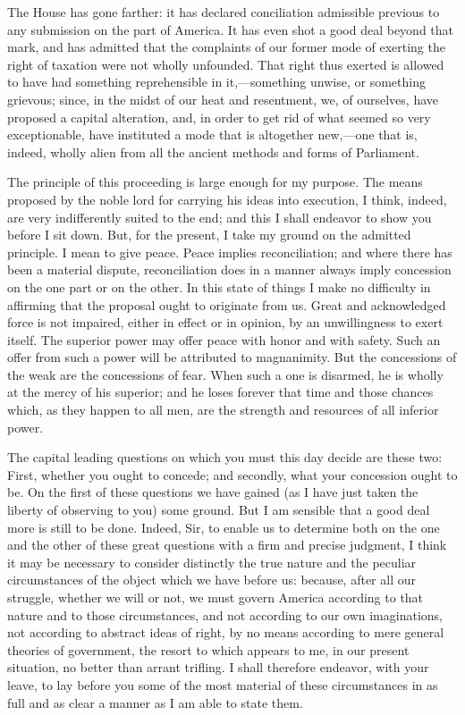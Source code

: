 The House has gone farther: it has declared conciliation admissible previous to any submission on the part of America. It has even shot a good deal beyond that mark, and has admitted that the complaints of our former mode of exerting the right of taxation were not wholly unfounded. That right thus exerted is allowed to have had something reprehensible in it,—something unwise, or something grievous; since, in the midst of our heat and resentment, we, of ourselves, have proposed a capital alteration, and, in order to get rid of what seemed so very exceptionable, have instituted a mode that is altogether new,—one that is, indeed, wholly alien from all the ancient methods and forms of Parliament.

The principle of this proceeding is large enough for my purpose. The means proposed by the noble lord for carrying his ideas into execution, I think, indeed, are very indifferently suited to the end; and this I shall endeavor to show you before I sit down. But, for the present, I take my ground on the admitted principle. I mean to give peace. Peace implies reconciliation; and where there has been a material dispute, reconciliation does in a manner always imply concession on the one part or on the other. In this state of things I make no difficulty in affirming that the proposal ought to originate from us. Great and acknowledged force is not impaired, either in effect or in opinion, by an unwillingness to exert itself. The superior power may offer peace with honor and with safety. Such an offer from such a power will be attributed to magnanimity. But the concessions of the weak are the concessions of fear. When such a one is disarmed, he is wholly at the mercy of his superior; and he loses forever that time and those chances which, as they happen to all men, are the strength and resources of all inferior power.

The capital leading questions on which you must this day decide are these two: First, whether you ought to concede; and secondly, what your concession ought to be. On the first of these questions we have gained (as I have just taken the liberty of observing to you) some ground. But I am sensible that a good deal more is still to be done. Indeed, Sir, to enable us to determine both on the one and the other of these great questions with a firm and precise judgment, I think it may be necessary to consider distinctly the true nature and the peculiar circumstances of the object which we have before us: because, after all our struggle, whether we will or not, we must govern America according to that nature and to those circumstances, and not according to our own imaginations, not according to abstract ideas of right, by no means according to mere general theories of government, the resort to which appears to me, in our present situation, no better than arrant trifling. I shall therefore endeavor, with your leave, to lay before you some of the most material of these circumstances in as full and as clear a manner as I am able to state them.

